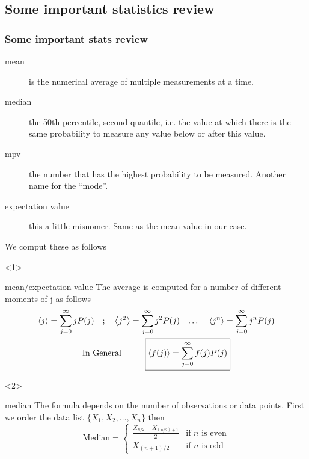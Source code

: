 \subsection[Stats review]{Some important statistics review}

\begin{frame}
	\frametitle{Some important stats review}
	\begin{description}
		\item[mean] is the numerical average of multiple measurements at a time.
		\item[median] the 50th percentile, second quantile, i.e. the value at which there
		      is the same probability to measure any value below or after this value.
		\item[mpv] the number that has the highest probability to be measured.
		      Another name for the ``mode''.
		\item[expectation value]  this a little misnomer. Same as the mean value in our case.
	\end{description}
	We comput these as follows

	\begin{onlyenv}

		\begin{block}{mean/expectation value}
			The average is computed for a number of different moments of j as follows
			\begin{gather}
				\ev{j}= \sum_{j=0}^\infty j P(j) \qq{;} \ev{j^2} = \sum_{j=0}^\infty j^2 P(j) \qq{\dots} \ev{j^n} = \sum_{j=0}^\infty j^n P(j)\\
				\text{In General} \hspace{1cm} \boxed{\ev{f(j)} = \sum_{j=0}^\infty f(j) P(j)}
			\end{gather}

		\end{block}

	\end{onlyenv}

	\begin{onlyenv}

		\begin{block}{median}
			The formula depends on the number of observations or data points. First we order the data list
			$\{X_1, X_2, \dots, X_n\}$ then
			\[
				\text{Median} =
				\begin{cases}
					\frac{X_{n/2} + X_{(n/2)+1}}{2} & \text{if } n \text{ is even} \\
					X_{(n+1)/2}                     & \text{if } n \text{ is odd}
				\end{cases}
			\]

		\end{block}

	\end{onlyenv}

\end{frame}



